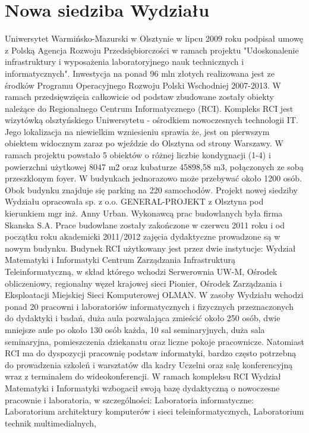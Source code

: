 \documentclass[a4paper,12pt]{article}
\begin{document}
\section{Nowa siedziba Wydziału}\label{sec:}
Uniwersytet Warmińsko-Mazurski w Olsztynie w lipcu 2009 roku podpisał umowę z Polską Agencja Rozwoju
Przedsiębiorczości w ramach projektu "Udoskonalenie infrastruktury i wyposażenia laboratoryjnego nauk
technicznych i informatycznych". Inwestycja na ponad 96 mln złotych realizowana jest ze środków Programu
Operacyjnego Rozwoju Polski Wschodniej 2007-2013. W ramach przedsięwzięcia całkowicie od podstaw
zbudowane zostały obiekty należące do Regionalnego Centrum Informatycznego (RCI).
Kompleks RCI jest wizytówką olsztyńskiego Uniwersytetu - ośrodkiem nowoczesnych technologii IT. Jego
lokalizacja na niewielkim wzniesieniu sprawia że, jest on pierwszym obiektem widocznym zaraz po wjeździe
do Olsztyna od strony Warszawy. W ramach projektu powstało 5 obiektów o różnej liczbie kondygnacji (1-4) i
powierzchni użytkowej 8047 m2 oraz kubaturze 45898,58 m3, połączonych ze sobą przeszklonym foyer. W
budynkach jednorazowo może przebywać około 1200 osób. Obok budynku znajduje się parking na 220
samochodów.
Projekt nowej siedziby Wydziału opracowała sp. z o.o. GENERAL-PROJEKT z Olsztyna pod kierunkiem mgr
inż. Anny Urban. Wykonawcą prac budowlanych była firma Skanska S.A. Prace budowlane zostały
zakończone w czerwcu 2011 roku i od początku roku akademicki 2011/2012 zajęcia dydaktyczne prowadzone
są w nowym budynku.
Budynek RCI użytkowany jest przez dwie instytucje:
Wydział Matematyki i Informatyki
Centrum Zarządzania Infrastrukturą Teleinformatyczną, w skład którego wchodzi Serwerownia UW-M,
Ośrodek obliczeniowy, regionalny węzeł krajowej sieci Pionier, Ośrodek Zarządzania i Eksploatacji
Miejskiej Sieci Komputerowej OLMAN.
W zasoby Wydziału wchodzi ponad 20 pracowni i laboratoriów informatycznych i fizycznych przeznaczonych
do dydaktyki i badań, duża aula pozwalająca zmieścić około 250 osób, dwie mniejsze aule po około 130 osób
każda, 10 sal seminaryjnych, duża sala seminaryjna, pomieszczenia dziekanatu oraz liczne pokoje pracownicze.
Natomiast RCI ma do dyspozycji pracownię podstaw informatyki, bardzo często potrzebną do prowadzenia
szkoleń i warsztatów dla kadry Uczelni oraz salę konferencyjną wraz z terminalem do wideokonferencji.
W ramach kompleksu RCI Wydział Matematyki i Informatyki wzbogacił swoją bazę dydaktyczną o
nowoczesne pracownie i laboratoria, w szczególności:
Laboratoria informatyczne:
Laboratorium architektury komputerów i sieci teleinformatycznych,
Laboratorium technik multimedialnych,
\end{document}
